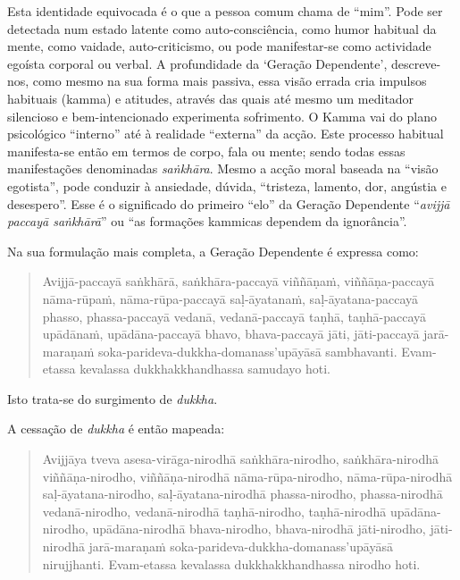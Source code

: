 Esta identidade equivocada é o que a pessoa comum chama de ``mim''. Pode ser
detectada num estado latente como auto-consciência, como humor habitual da
mente, como vaidade, auto-criticismo, ou pode manifestar-se como actividade
egoísta corporal ou verbal. A profundidade da `Geração Dependente',
descreve-nos, como mesmo na sua forma mais passiva, essa visão errada cria
impulsos habituais (kamma) e atitudes, através das quais até mesmo um meditador
silencioso e bem-intencionado experimenta sofrimento. O Kamma vai do plano
psicológico ``interno'' até à realidade ``externa'' da acção. Este processo
habitual manifesta-se então em termos de corpo, fala ou mente; sendo todas essas
manifestações denominadas \emph{saṅkhāra}. Mesmo a acção moral baseada na
``visão egotista'', pode conduzir à ansiedade, dúvida, ``tristeza, lamento, dor,
angústia e desespero''. Esse é o significado do primeiro ``elo'' da Geração
Dependente ``\emph{avijjā paccayā saṅkhārā}'' ou ``as formações kammicas
dependem da ignorância''.

Na sua formulação mais completa, a Geração Dependente é expressa como:

\begin{quote}
  \raggedright
  Avijjā-paccayā saṅkhārā,
  saṅkhāra-paccayā viññāṇaṁ,
  viññāṇa-paccayā nāma-rūpaṁ,
  nāma-rūpa-paccayā saḷ-āyatanaṁ,
  saḷ-āyatana-paccayā phasso,
  phassa-paccayā vedanā,
  vedanā-paccayā taṇhā,
  taṇhā-paccayā upādānaṁ,
  upādāna-paccayā bhavo,
  bhava-paccayā jāti,
  jāti-paccayā jarā-maraṇaṁ soka-parideva-dukkha-domanass'upāyāsā sambhavanti.
  Evam-etassa kevalassa dukkhakkhandhassa samudayo hoti.
\end{quote}

Isto trata-se do surgimento de \emph{dukkha}.

A cessação de \emph{dukkha} é então mapeada:

\begin{quote}
  \raggedright
  Avijjāya tveva asesa-virāga-nirodhā saṅkhāra-nirodho,
  saṅkhāra-nirodhā viññāṇa-nirodho,
  viññāṇa-nirodhā nāma-rūpa-nirodho,
  nāma-rūpa-nirodhā saḷ-āyatana-nirodho,
  saḷ-āyatana-nirodhā phassa-nirodho,
  phassa-nirodhā vedanā-nirodho,
  vedanā-nirodhā taṇhā-nirodho,
  taṇhā-nirodhā upādāna-nirodho,
  upādāna-nirodhā bhava-nirodho,
  bhava-nirodhā jāti-nirodho,
  jāti-nirodhā jarā-maraṇaṁ soka-parideva-dukkha-domanass'upāyāsā nirujjhanti.
  Evam-etassa kevalassa dukkhakkhandhassa nirodho hoti.

\end{quote}

